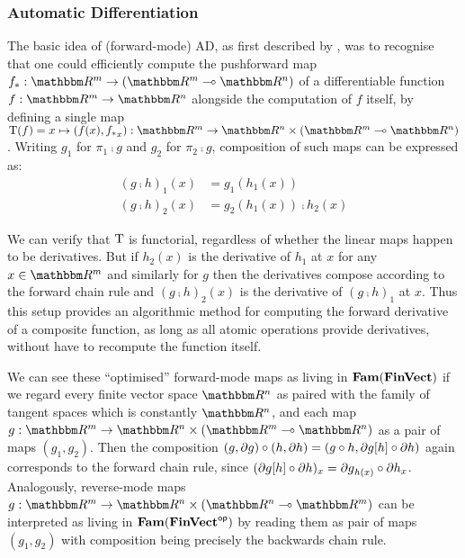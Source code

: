 \subsubsection{Automatic Differentiation}

The basic idea of (forward-mode) AD, as first described by \citet{linnainmaa76}, was to recognise that one
could efficiently compute the pushforward map $\pushf{f}: \RR^m \to (\RR^m \linearto \RR^n)$ of a
differentiable function $f: \RR^m \to \RR^n$ alongside the computation of $f$ itself, by defining a single map
$\tangents(f) = x \mapsto (f(x), \pushf{f}_x): \RR^m \to \RR^n \times (\RR^m \linearto \RR^n)$. Writing $g_1$
for $\pi_1 \comp g$ and $g_2$ for $\pi_2 \comp g$, composition of such maps can be expressed as:
\begin{align*}
(g \comp h)_1(x) &= g_1(h_1(x)) \\
(g \comp h)_2(x) &= g_2(h_1(x)) \comp h_2(x)
\end{align*}

We can verify that $\mathrm{T}$ is functorial, regardless of whether the linear maps happen to be derivatives.
But if $h_2(x)$ is the derivative of $h_1$ at $x$ for any $x \in \RR^m$ and similarly for $g$ then the
derivatives compose according to the forward chain rule and $(g \comp h)_2(x)$ is the derivative of $(g \comp
h)_1$ at $x$. Thus this setup provides an algorithmic method for computing the forward derivative of a
composite function, as long as all atomic operations provide derivatives, without have to recompute the
function itself.


We can see these ``optimised'' forward-mode maps as living in $\mathbf{Fam}(\mathbf{FinVect})$ if we regard every finite
vector space $\RR^n$ as paired with the family of tangent spaces which is constantly $\RR^n$, and each map $g:
\RR^m \to \RR^n \times (\RR^m \linearto \RR^n)$ as a pair of maps $(g_1, g_2)$. Then the composition $(g,
\partial g) \circ (h, \partial h) = (g \circ h, \partial g[h] \circ \partial h)$ again corresponds
to the forward chain rule, since $(\partial g[h] \circ \partial h)_x = {\partial g}_{h(x)} \circ
{\partial h}_x$. Analogously, reverse-mode maps $g: \RR^m \to \RR^n \times (\RR^n \linearto \RR^m)$ can be
interpreted as living in $\mathbf{Fam}(\mathbf{FinVect}^{\mathsf{op}})$ by reading them as pair of maps $(g_1, g_2)$ with composition
being precisely the backwards chain rule.
